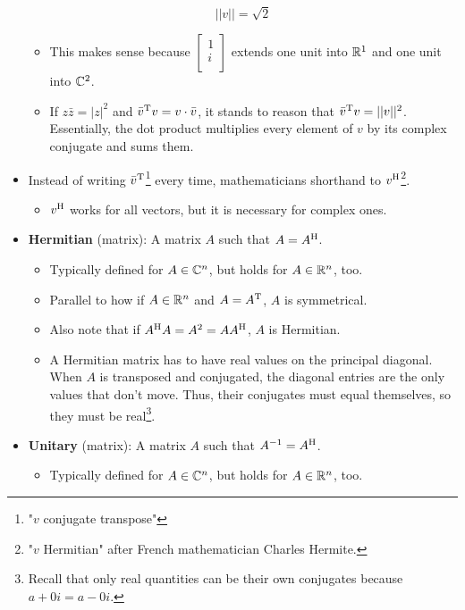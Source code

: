 \documentclass{article}
\begin{document}
\begin{itemize}
\begin{equation*}
        ||v|| = \sqrt{2}
    \end{equation*}
    \begin{itemize}
        \item This makes sense because $
            \begin{bmatrix}
                1\\
                i\\
            \end{bmatrix}
        $ extends one unit into $\mathbb{R}^1$ and one unit into $\mathbb{C}^2$.
        \item If $z\bar{z}=|z|^2$ and $\bar{v}^{\text{T}} v=v\cdot \bar{v}$, it stands to reason that $\bar{v}^{\text{T}} v=||v||^2$. Essentially, the dot product multiplies every element of $v$ by its complex conjugate and sums them.
    \end{itemize}
    \item Instead of writing $\bar{v}^{\text{T}}$\footnote{"$v$ conjugate transpose"} every time, mathematicians shorthand to $v^{\text{H}}$\footnote{"$v$ Hermitian" after French mathematician Charles Hermite.}.
    \begin{itemize}
        \item $v^{\text{H}}$ works for all vectors, but it is necessary for complex ones.
    \end{itemize}
    \item \textbf{Hermitian} (matrix): A matrix $A$ such that $A=A^{\text{H}}$.
    \begin{itemize}
        \item Typically defined for $A\in\mathbb{C}^n$, but holds for $A\in\mathbb{R}^n$, too.
        \item Parallel to how if $A\in\mathbb{R}^n$ and $A=A^{\text{T}}$, $A$ is symmetrical.
        \item Also note that if $A^{\text{H}} A=A^2=AA^{\text{H}}$, $A$ is Hermitian.
        \item A Hermitian matrix has to have real values on the principal diagonal. When $A$ is transposed and conjugated, the diagonal entries are the only values that don't move. Thus, their conjugates must equal themselves, so they must be real\footnote{\label{fnt:realConjugate}Recall that only real quantities can be their own conjugates because $a+0i=a-0i$.}.
    \end{itemize}
    \item \textbf{Unitary} (matrix): A matrix $A$ such that $A^{-1}=A^{\text{H}}$.
    \begin{itemize}
        \item Typically defined for $A\in\mathbb{C}^n$, but holds for $A\in\mathbb{R}^n$, too.

\end{itemize}
\end{itemize}
\end{document}
